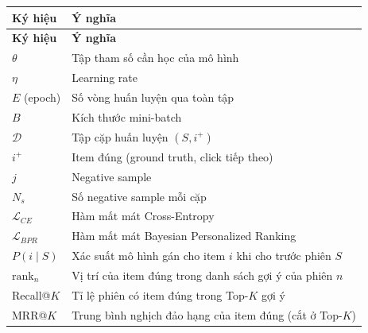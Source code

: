 \documentclass[12pt, a4paper]{article}
\begin{document}
\begin{longtable}{@{}p{4.2cm} p{11cm}@{}}
\toprule
\textbf{Ký hiệu} & \textbf{Ý nghĩa} \\
\midrule
\endfirsthead
\toprule
\textbf{Ký hiệu} & \textbf{Ý nghĩa} \\
\midrule
\endhead
\bottomrule
\endfoot

$\theta$                                     & Tập tham số cần học của mô hình \\
$\eta$                                       & Learning rate \\
$E$ (epoch)                                  & Số vòng huấn luyện qua toàn tập \\
$B$                                          & Kích thước mini-batch \\
$\mathcal{D}$                                & Tập cặp huấn luyện $(S, i^+)$ \\
$i^+$                                        & Item đúng (ground truth, click tiếp theo) \\
$j$                                          & Negative sample \\
$N_s$                                        & Số negative sample mỗi cặp \\
$\mathcal{L}_{CE}$                           & Hàm mất mát Cross-Entropy \\
$\mathcal{L}_{BPR}$                          & Hàm mất mát Bayesian Personalized Ranking \\
$P(i \mid S)$                                & Xác suất mô hình gán cho item $i$ khi cho trước phiên $S$ \\
$\text{rank}_n$                              & Vị trí của item đúng trong danh sách gợi ý của phiên $n$ \\
Recall@$K$                                   & Tỉ lệ phiên có item đúng trong Top-$K$ gợi ý \\
MRR@$K$                                      & Trung bình nghịch đảo hạng của item đúng (cắt ở Top-$K$) \\

\end{longtable}

\newpage
\renewcommand{\contentsname}{MỤC LỤC}
\renewcommand{\listfigurename}{DANH MỤC HÌNH VẼ}
\renewcommand{\listtablename}{DANH MỤC BẢNG}
\tableofcontents
\newpage
\listoffigures
\newpage
\listoftables
\newpage
{}
\setcounter{page}{1}
\end{document}
